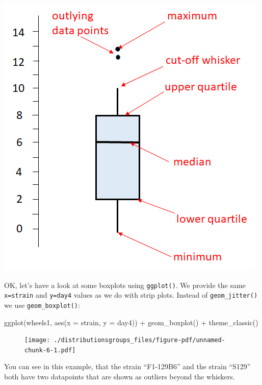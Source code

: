 \documentclass[
  letterpaper,
  DIV=11,
  numbers=noendperiod]{scrreprt}
\newenvironment{Shaded}{\begin{snugshade}}{\end{snugshade}}
\newcommand{\AttributeTok}[1]{\textcolor[rgb]{0.40,0.45,0.13}{#1}}
\newcommand{\FunctionTok}[1]{\textcolor[rgb]{0.28,0.35,0.67}{#1}}
\newcommand{\NormalTok}[1]{\textcolor[rgb]{0.00,0.23,0.31}{#1}}
\newcommand{\SpecialCharTok}[1]{\textcolor[rgb]{0.37,0.37,0.37}{#1}}
\begin{document}
\includegraphics{./img/box3.png}

OK, let's have a look at some boxplots using \texttt{ggplot()}. We
provide the same \texttt{x=strain} and \texttt{y=day4} values as we do
with strip plots. Instead of \texttt{geom\_jitter()} we use
\texttt{geom\_boxplot()}:

\begin{Shaded}
\begin{Highlighting}[]
\FunctionTok{ggplot}\NormalTok{(wheels1, }\FunctionTok{aes}\NormalTok{(}\AttributeTok{x =}\NormalTok{ strain, }\AttributeTok{y =}\NormalTok{ day4)) }\SpecialCharTok{+} 
  \FunctionTok{geom\_boxplot}\NormalTok{()  }\SpecialCharTok{+}
  \FunctionTok{theme\_classic}\NormalTok{()}
\end{Highlighting}
\end{Shaded}

\begin{figure}[H]

{\centering \texttt{[image: ./distributionsgroups\_files/figure-pdf/unnamed-chunk-6-1.pdf]}

}

\end{figure}

You can see in this example, that the strain ``F1-129B6'' and the strain
``S129'' both have two datapoints that are shown as outliers beyond the
whiskers.
\end{document}
